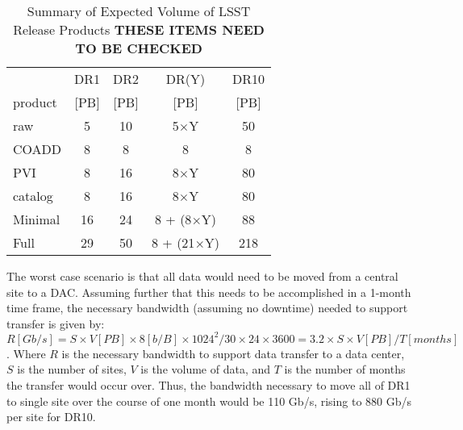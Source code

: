 \begin{table}[!ht]
\caption{Summary of Expected Volume of LSST Release Products {\bf THESE ITEMS NEED TO BE CHECKED }}
\label{tab_volume}
\footnotesize
\centering
\begin{tabular}[]{|l|cccc|}
\hline
\hline
            &   DR1  &  DR2   &  DR(Y)  &  DR10 \\
 product    &  [PB]  &  [PB]  &  [PB]   &  [PB] \\
\hline
 raw        &    5   &   10   &  5$\times$Y    &   50   \\
 COADD      &    8   &    8   &    8           &    8   \\
 PVI        &    8   &   16   &  8$\times$Y    &   80   \\
 catalog    &    8   &   16   &  8$\times$Y    &   80   \\
\hline
 Minimal    &   16   &   24   &  8 + (8$\times$Y) &   88   \\
 Full       &   29   &   50   &  8 + (21$\times$Y) &  218  \\
\hline
\end{tabular}
\end{table}


The worst case scenario is that all data would need to be moved from a central site to a DAC.  
Assuming further that this needs to be accomplished in a 1-month time frame, the necessary bandwidth 
(assuming no downtime) needed to support transfer is given by: 
$$ R[Gb/s] = S \times V[PB] \times 8 [b/B] \times 1024^2 / 30 \times 24 \times 3600 = 3.2 \times S \times V[PB] / T[months] $$.
Where $R$ is the necessary bandwidth to support data transfer to a data center, $S$ is the number 
of sites, $V$ is the volume of data, and $T$ is the number of months the transfer would occur over.  
Thus, the bandwidth necessary to move all of DR1 to single site over the course of one month would
be 110 Gb/s, rising to 880 Gb/s per site for DR10.

